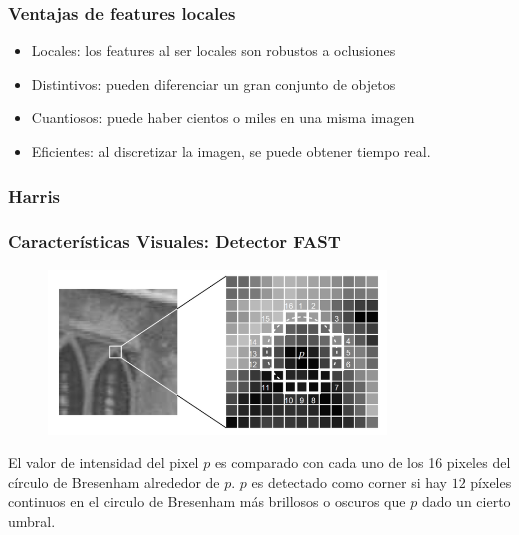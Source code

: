 \begin{frame}
	\frametitle{Ventajas de features locales}
	\footnotesize

	\begin{itemize}
	\item Locales: los features al ser locales son robustos a oclusiones
	\item Distintivos: pueden diferenciar un gran conjunto de objetos
	\item Cuantiosos: puede haber cientos o miles en una misma imagen
	\item Eficientes: al discretizar la imagen, se puede obtener tiempo real.
\end{itemize}
	
\end{frame}

\begin{frame}
	\frametitle{Harris}
	\footnotesize
	
	
\end{frame}

\begin{frame}
	\frametitle{Características Visuales: Detector FAST}
	
	\begin{figure}
		\includegraphics[width=0.8\textwidth]{./images/camera/fast}
	\end{figure}
	
	El valor de intensidad del pixel $p$ es comparado con cada uno de los 16 pixeles del círculo de Bresenham alrededor de $p$. $p$ es detectado como corner si hay $12$ píxeles continuos en el circulo de Bresenham más brillosos o oscuros que $p$ dado un cierto umbral.
\end{frame}

